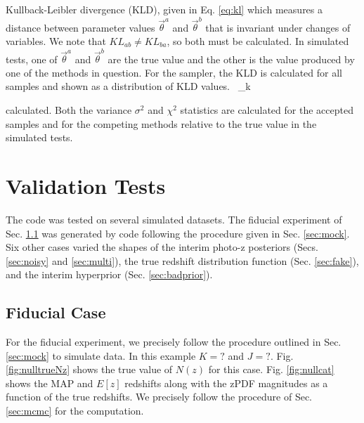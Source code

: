 \documentclass[preprint]{aastex}
\begin{document}
Kullback-Leibler divergence (KLD), given in Eq. \ref{eq:kl} which measures a 
distance between parameter values $\vec{\theta}^{a}$ and $\vec{\theta}^{b}$ 
that is invariant under changes of variables.  We note that $KL_{ab}\neq 
KL_{ba}$, so both must be calculated.  In simulated tests, one of 
$\vec{\theta}^{a}$ and $\vec{\theta}^{b}$ are the true value and the other is 
the value produced by one of the methods in question.  For the sampler, the KLD 
is calculated for all samples and shown as a distribution of KLD values.
%
\ln{}\ \Delta_{k}

calculated.  Both the variance $\sigma^{2}$ and $\chi^{2}$ statistics are 
calculated for the accepted samples and for the competing methods relative to 
the true value in the simulated tests.
%

\clearpage
\section{Validation Tests}
\label{sec:valid}

The code was tested on several simulated datasets.  The fiducial experiment of 
Sec. \ref{sec:null} was generated by code following the procedure given in Sec. 
\ref{sec:mock}.  Six other cases varied the shapes of the interim photo-z 
posteriors (Secs. \ref{sec:noisy} and \ref{sec:multi}), the true redshift 
distribution function (Sec. \ref{sec:fake}), and the interim hyperprior (Sec. 
\ref{sec:badprior}).  

\clearpage
\subsection{Fiducial Case}
\label{sec:null}

For the fiducial experiment, we precisely follow the procedure outlined in Sec. 
\ref{sec:mock} to simulate data.  In this example $K=?$ and $J=?$.  Fig. 
\ref{fig:nulltrueNz} shows the true value of $N(z)$ for this case.  Fig. 
\ref{fig:nullcat} shows the MAP and $E[z]$ redshifts along with the zPDF 
magnitudes as a function of the true redshifts.  We precisely follow the 
procedure of Sec. \ref{sec:mcmc} for the computation.  
\end{document}
